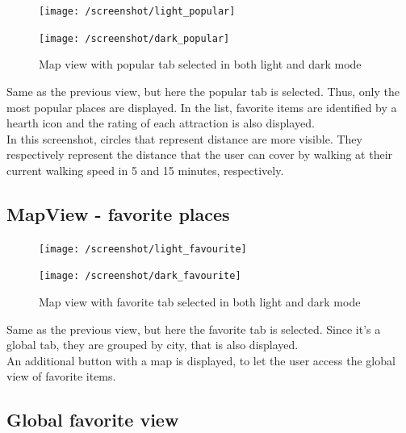 \documentclass[a4paper, 11pt, parskip=half]{scrreprt}
\theoremstyle{definition}
\begin{document}
\begin{figure}[H]
	\centering
	\begin{minipage}{.5\textwidth}
  	\centering
  	\texttt{[image: /screenshot/light\_popular]}
  	\label{fig:test1}
	\end{minipage}%
	\begin{minipage}{.5\textwidth}
  	\centering
  	\texttt{[image: /screenshot/dark\_popular]}
  	\label{fig:test2}
	\end{minipage}
	\caption{Map view with popular tab selected in both light and dark mode}
\end{figure}

Same as the previous view, but here the popular tab is selected. Thus, only the most popular places are displayed. In the list, favorite items are identified by a hearth icon and the rating of each attraction is also displayed.
\\In this screenshot, circles that represent distance are more visible. They respectively represent the distance that the user can cover by walking at their current walking speed in 5 and 15 minutes, respectively.

\subsection{MapView - favorite places}

\begin{figure}[H]
	\centering
	\begin{minipage}{.5\textwidth}
  	\centering
  	\texttt{[image: /screenshot/light\_favourite]}
  	\label{fig:test1}
	\end{minipage}%
	\begin{minipage}{.5\textwidth}
  	\centering
  	\texttt{[image: /screenshot/dark\_favourite]}
  	\label{fig:test2}
	\end{minipage}
	\caption{Map view with favorite tab selected in both light and dark mode}
\end{figure}

Same as the previous view, but here the favorite tab is selected. Since it's a global tab, they are grouped by city, that is also displayed. 
\\An additional button with a map is displayed, to let the user access the global view of favorite items.

\subsection{Global favorite view}
\end{document}
